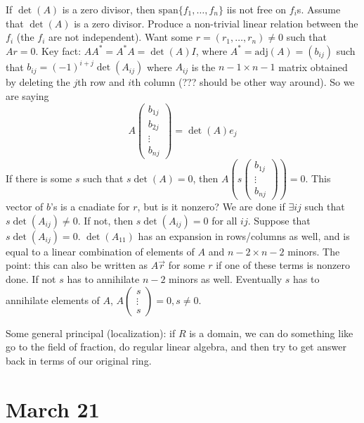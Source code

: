 \documentclass{article}
\theoremstyle{plain}
\theoremstyle{remark}
\begin{document}
If $\det(A)$ is a zero divisor, then $\mathrm{span}\{f_1,\dots,f_n\}$
iis not free on $f_i$s.
Assume that $\det(A)$ is a zero divisor.
Produce a non-trivial linear relation between the $f_i$ (the $f_i$ are not independent).
Want some $r = (r_1,\dots,r_n) \neq 0$ such that $Ar = 0$.
Key fact: $AA^* = A^*A = \det(A)I$,
where $A^* = \mathrm{adj}(A) = (b_{ij})$ such that $b_{ij} = (-1)^{i+j}\det(A_{ij})$
where $A_{ij}$ is the $n-1 \times n-1$ matrix obtained by deleting
the $j$th row and $i$th column (??? should be other way around).
So we are saying
\[
	A \begin{pmatrix} b_{1j} \\ b_{2j} \\ \vdots \\ b_{nj} \end{pmatrix}
	= \det(A) e_j
\]
If there is some $s$ such that $s\det(A) = 0$, then
$A\left(s\begin{pmatrix} b_{1j} \\ \vdots \\ b_{nj} \end{pmatrix} \right) = 0$.
This vector of $b$'s is a cnadiate for $r$, but is it nonzero?
We are done if $\exists ij$ such that $s\det(A_{ij}) \neq 0$.
If not, then $s\det(A_{ij}) = 0$ for all $ij$.
Suppose that $s\det(A_{ij}) = 0$.
$\det(A_{11})$ has an expansion in rows/columns as well,
and is equal to a linear combination of elements of $A$ and $n-2 \times n-2$ minors.
The point: this can also be written as $A\vec{r}$ for some $r$
if one of these terms is nonzero done.
If not $s$ has to annihilate $n-2$ minors as well.
Eventually $s$ has to annihilate elements of $A$,
$A \begin{pmatrix} s \\ \vdots \\ s \end{pmatrix} = 0, s\neq0$.

Some general principal (localization):
if $R$ is a domain, we can do something like go to the field of fraction,
do regular linear algebra, and then try to get answer back in terms of our original ring.


\section{March 21}
\end{document}
